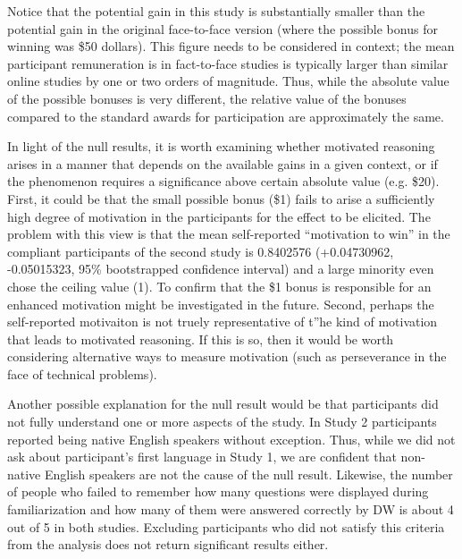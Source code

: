 \documentclass{article}
\begin{document}
Notice that the potential gain in this study is substantially smaller than the potential gain in the original face-to-face version (where the possible bonus for winning was \$50 dollars). This figure needs to be considered in context; the mean participant remuneration is in fact-to-face studies is typically larger than similar online studies by one or two orders of magnitude. Thus, while the absolute value of the possible bonuses is very different, the relative value of the bonuses compared to the standard awards for participation are approximately the same. 

In light of the null results, it is worth examining whether motivated reasoning arises in a manner that depends on the available gains in a given context, or if the phenomenon requires a significance above certain absolute value (e.g. \$20). First, it could be that the small possible bonus (\$1) fails to arise a sufficiently high degree of motivation in the participants for the effect to be elicited. The problem with this view is that the mean self-reported ``motivation to win'' in the compliant participants of the second study is 0.8402576 (+0.04730962, -0.05015323, 95\% bootstrapped confidence interval) and a large minority even chose the ceiling value (1). To confirm that the \$1 bonus is responsible for an enhanced motivation might be investigated in the future. Second, perhaps the self-reported motivaiton is not truely representative of t''he kind of motivation that leads to motivated reasoning. If this is so, then it would be worth considering alternative ways to measure motivation (such as perseverance in the face of technical problems).

Another possible explanation for the null result would be that participants did not fully understand one or more aspects of the study. In Study 2 participants reported being native English speakers without exception. Thus, while we did not ask about participant's first language in Study 1, we are confident that non-native English speakers are not the cause of the null result. Likewise, the number of people who failed to remember how many questions were displayed during familiarization and how many of them were answered correctly by DW is about 4 out of 5 in both studies. Excluding participants who did not satisfy this criteria from the analysis does not return significant results either. 
\end{document}
